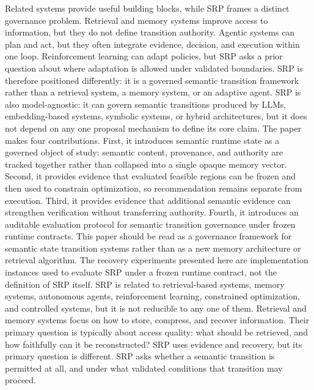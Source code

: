 {}Related systems provide useful building blocks, while SRP frames a distinct governance problem. Retrieval and memory systems improve access to information, but they do not define transition authority. Agentic systems can plan and act, but they often integrate evidence, decision, and execution within one loop. Reinforcement learning can adapt policies, but SRP asks a prior question about where adaptation is allowed under validated boundaries. SRP is therefore positioned differently: it is a governed semantic transition framework rather than a retrieval system, a memory system, or an adaptive agent.\markdownRendererParagraphSeparator
{}SRP is also model-agnostic: it can govern semantic transitions produced by LLMs, embedding-based systems, symbolic systems, or hybrid architectures, but it does not depend on any one proposal mechanism to define its core claim.\markdownRendererParagraphSeparator
{}The paper makes four contributions. First, it introduces semantic runtime state as a governed object of study: semantic content, provenance, and authority are tracked together rather than collapsed into a single opaque memory vector. Second, it provides evidence that evaluated feasible regions can be frozen and then used to constrain optimization, so recommendation remains separate from execution. Third, it provides evidence that additional semantic evidence can strengthen verification without transferring authority. Fourth, it introduces an auditable evaluation protocol for semantic transition governance under frozen runtime contracts.\markdownRendererParagraphSeparator
{}This paper should be read as a governance framework for semantic state transition systems rather than as a new memory architecture or retrieval algorithm. The recovery experiments presented here are implementation instances used to evaluate SRP under a frozen runtime contract, not the definition of SRP itself.\markdownRendererInterblockSeparator
{}
\markdownRendererSectionEnd \markdownRendererSectionBegin
{}\markdownRendererInterblockSeparator
{}SRP is related to retrieval-based systems, memory systems, autonomous agents, reinforcement learning, constrained optimization, and controlled systems, but it is not reducible to any one of them.\markdownRendererParagraphSeparator
{}Retrieval and memory systems focus on how to store, compress, and recover information. Their primary question is typically about access quality: what should be retrieved, and how faithfully can it be reconstructed? SRP uses evidence and recovery, but its primary question is different. SRP asks whether a semantic transition is permitted at all, and under what validated conditions that transition may proceed.\markdownRendererParagraphSeparator
